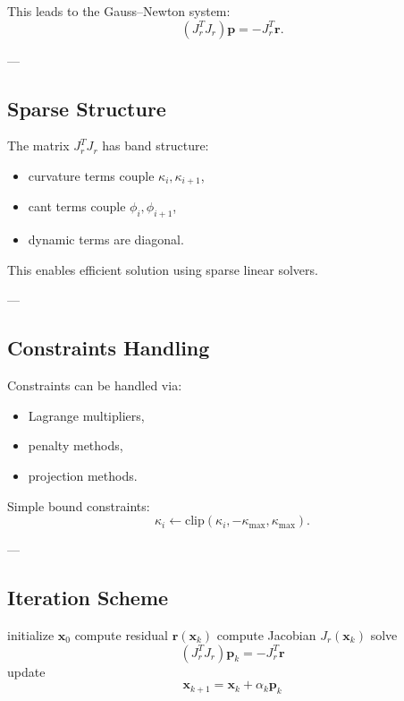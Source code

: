 \begin{remark}
This leads to the Gauss--Newton system:
\[
(J_r^T J_r)\mathbf{p}
=
- J_r^T \mathbf{r}.
\]
\end{remark}

---

\subsection{Sparse Structure}

\begin{remark}
The matrix \(J_r^T J_r\) has band structure:
\begin{itemize}
\item curvature terms couple \(\kappa_i, \kappa_{i+1}\),
\item cant terms couple \(\phi_i, \phi_{i+1}\),
\item dynamic terms are diagonal.
\end{itemize}
\end{remark}

\begin{remark}
This enables efficient solution using sparse linear solvers.
\end{remark}

---

\subsection{Constraints Handling}

\begin{remark}
Constraints can be handled via:
\begin{itemize}
\item Lagrange multipliers,
\item penalty methods,
\item projection methods.
\end{itemize}
\end{remark}

\begin{example}
Simple bound constraints:
\[
\kappa_i \leftarrow \mathrm{clip}(\kappa_i, -\kappa_{\max}, \kappa_{\max}).
\]
\end{example}

---

\subsection{Iteration Scheme}

\begin{algorithm}
\caption{SQP iteration}
\begin{algorithmic}
\State initialize $\mathbf{x}_0$
  \State compute residual $\mathbf{r}(\mathbf{x}_k)$
  \State compute Jacobian $J_r(\mathbf{x}_k)$
  \State solve
  \[
  (J_r^T J_r)\mathbf{p}_k = -J_r^T \mathbf{r}
  \]
  \State update
  \[
  \mathbf{x}_{k+1} = \mathbf{x}_k + \alpha_k \mathbf{p}_k
  \]
\EndFor
\end{algorithmic}
\end{algorithm}

